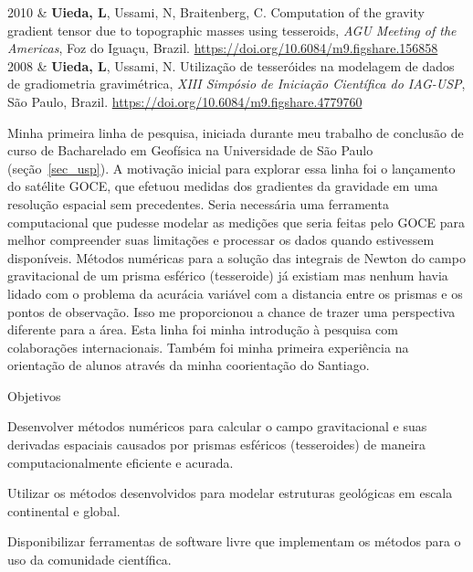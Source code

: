 \documentclass[10pt,a4paper,oneside]{book}
\newcommand{\Me}{\textbf{Uieda, L}}
\newcommand{\Carla}{Braitenberg, C}
\newcommand{\Naomi}{Ussami, N}
\newcommand{\DOI}[1]{\url{https://doi.org/#1}}
\begin{document}
\begin{subsummarybox}[frametitle=\faComment{}\quad Outras apresentações]
  \begin{paperlist}
    2010 & \Me, \Naomi, \Carla.
      Computation of the gravity gradient tensor due to topographic masses
      using tesseroids,
      \emph{AGU Meeting of the Americas},
      Foz do Iguaçu, Brazil.
      \DOI{10.6084/m9.figshare.156858}
      \\
    2008 & \Me, \Naomi.
      Utilização de tesseróides na modelagem de dados de gradiometria
      gravimétrica,
      \emph{XIII Simpósio de Iniciação Científica do IAG-USP},
      São Paulo, Brazil.
      \DOI{10.6084/m9.figshare.4779760}
  \end{paperlist}
\end{subsummarybox}

Minha primeira linha de pesquisa, iniciada durante meu trabalho de conclusão
de curso de Bacharelado em Geofísica na Universidade de São Paulo
(seção~\ref{sec_usp}).
A motivação inicial para explorar essa linha foi o lançamento do satélite
GOCE, que efetuou medidas dos gradientes da gravidade em uma resolução espacial
sem precedentes.
Seria necessária uma ferramenta computacional que pudesse modelar as medições
que seria feitas pelo GOCE para melhor compreender suas limitações e processar
os dados quando estivessem disponíveis.
Métodos numéricas para a solução das integrais de Newton do campo gravitacional
de um prisma esférico (tesseroide) já existiam
\citep{Heck2006,Asgharzadeh2007,WildPfeiffer2008} mas nenhum havia lidado com o
problema da acurácia variável com a distancia entre os prismas e os pontos de
observação.
Isso me proporcionou a chance de trazer uma perspectiva diferente para a área.
Esta linha foi minha introdução à pesquisa com colaborações internacionais.
Também foi minha primeira experiência na orientação de alunos através da minha
coorientação do Santiago.

\begin{fancyenum}{\faBullseye}{Objetivos}
  \item Desenvolver métodos numéricos para calcular o campo gravitacional e
    suas derivadas espaciais causados por prismas esféricos (tesseroides) de
    maneira computacionalmente eficiente e acurada.
  \item Utilizar os métodos desenvolvidos para modelar estruturas geológicas em
    escala continental e global.
  \item Disponibilizar ferramentas de software livre que implementam os métodos
    para o uso da comunidade científica.
\end{fancyenum}
\end{document}
